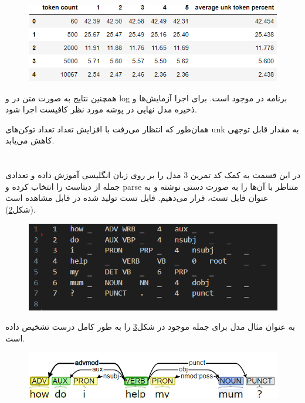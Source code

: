 \documentclass[10pt]{article}
\begin{document}
\begin{figure}[ht!]
	\centering\includegraphics[width=\linewidth]{../reports/tokenization.png}
	\caption{
		}
	\label{tok}
\end{figure}

همچنین نتایج به صورت متن در
و log برنامه در 
موجود است. برای اجرا آزمایش‌ها و ذخیره مدل نهایی در پوشه مورد نظر کافیست 
اجرا شود.

همان‌طور که انتظار می‌رفت با افزایش تعداد
تعداد توکن‌های unk به مقدار قابل توجهی کاهش می‌یابد.
\newpage

\section{
}

در این قسمت به کمک کد تمرین 3 مدل
را بر روی زبان انگلیسی آموزش داده و تعدادی جمله از دیتاست را انتخاب کرده و parse متناظر با آن‌ها را به صورت دستی نوشته و به عنوان فایل تست، قرار می‌دهیم. فایل تست تولید شده در 
قابل مشاهده است (شکل\ref{dep_parser_test}).
\begin{figure}[ht!]
	\centering\includegraphics[width=\linewidth]{../reports/dep_parser_test.png}
	\caption{
		}
	\label{dep_parser_test}
\end{figure}

به عنوان مثال مدل برای جمله موجود در شکل\ref{dep_parser} 
را به طور کامل درست تشخیص داده است.
\begin{figure}[ht!]
	\centering\includegraphics[width=\linewidth]{../reports/dep_parser_1.png}
	\caption{
		}
	\label{dep_parser}
\end{figure}
\end{document}
